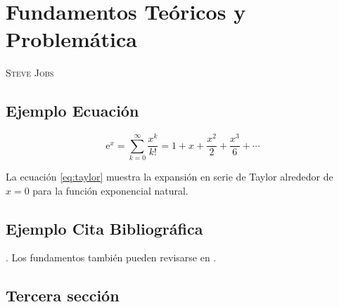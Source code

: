\chapter{Fundamentos Teóricos y Problemática}
              {\textsc{Steve Jobs}}

\section{Ejemplo Ecuación}

\lipsum[1]

\begin{equation}                                                     
\mathrm{e}^{x} = \sum_{k=0}^{\infty} \frac{x^k}{k!} = 
1 + x + \frac{x^2}{2} + \frac{x^3}{6} + \cdots
\label{eq:taylor}
\end{equation}

La ecuación \eqref{eq:taylor} muestra la expansión en serie de Taylor alrededor de $x = 0$ para la función exponencial natural.

\section{Ejemplo Cita Bibliográfica}
\lipsum[3-4].  
Los fundamentos también pueden revisarse en \cite{knuth97}. 

\section{Tercera sección}
\lipsum[5-6]
